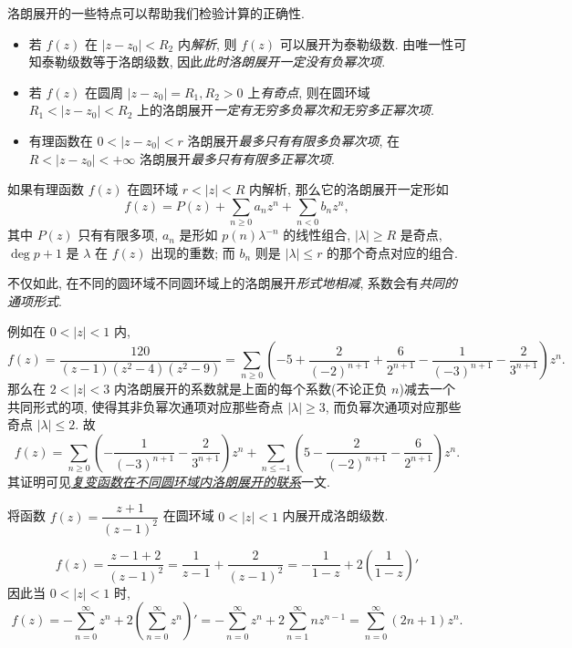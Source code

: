 洛朗展开的一些特点可以帮助我们检验计算的正确性.
\begin{itemize}
	\item  若 $f(z)$ 在 $|z-z_0|<R_2$ 内\emph{解析},
		则 $f(z)$ 可以展开为泰勒级数.
		由唯一性可知泰勒级数等于洛朗级数,
		因此\emph{此时洛朗展开一定没有负幂次项}.
	\item 若 $f(z)$ 在圆周 $|z-z_0|=R_1,R_2>0$ 上\emph{有奇点}, 则在圆环域 $R_1<|z-z_0|<R_2$ 上的洛朗展开\emph{一定有无穷多负幂次和无穷多正幂次项}.
	\item 有理函数在 $0<|z-z_0|<r$ 洛朗展开\emph{最多只有有限多负幂次项}, 在 $R<|z-z_0|<+\infty$ 洛朗展开\emph{最多只有有限多正幂次项}.
\end{itemize}

如果有理函数 $f(z)$ 在圆环域 $r<|z|<R$ 内解析, 那么它的洛朗展开一定形如
\[f(z)=P(z)+\sum_{n\ge 0}a_n z^n+\sum_{n<0}b_n z^n,\]
其中 $P(z)$ 只有有限多项, 
$a_n$ 是形如 $p(n)\lambda^{-n}$ 的线性组合, $|\lambda|\ge R$ 是奇点, $\deg p+1$ 是 $\lambda$ 在 $f(z)$ 出现的重数; 而 $b_n$ 则是 $|\lambda|\le r$ 的那个奇点对应的组合.

不仅如此, 在不同的圆环域不同圆环域上的洛朗展开{\itshape 形式地相减}, 系数会有\emph{共同的通项形式}.

例如在 $0<|z|<1$ 内,
\[f(z)=\frac{120}{(z-1)(z^2-4)(z^2-9)}=\sum_{n\ge 0}\left(-5+\frac2{(-2)^{n+1}}+\frac6{2^{n+1}}-\frac1{(-3)^{n+1}}-\frac2{3^{n+1}}\right)z^n.\]
那么在 $2<|z|<3$ 内洛朗展开的系数就是上面的每个系数(不论正负 $n$)减去一个共同形式的项, 使得其非负幂次通项对应那些奇点 $|\lambda|\ge 3$, 而负幂次通项对应那些奇点 $|\lambda|\le2$.
故
\[f(z)=\sum_{n\ge 0}\left(-\frac1{(-3)^{n+1}}-\frac2{3^{n+1}}\right)z^n+\sum_{n\le-1}\left(5-\frac2{(-2)^{n+1}}-\frac6{2^{n+1}}\right)z^n.\]
其证明可见\emph{\href{https://zhangshenxing.gitee.io/teaching/publications/袁志杰张神星2023 复变函数在不同圆环域内洛朗展开的联系.pdf}{复变函数在不同圆环域内洛朗展开的联系}}一文.

\begin{example}
	将函数 $f(z)=\dfrac{z+1}{(z-1)^2}$ 在圆环域 $0<|z|<1$ 内展开成洛朗级数.
\end{example}

\begin{solution}
	\[f(z)=\frac{z-1+2}{(z-1)^2}=\frac1{z-1}+\frac{2}{(z-1)^2}=-\frac1{1-z}+2\left(\frac1{1-z}\right)'\]
	{因此当 $0<|z|<1$ 时,
		\[f(z)=-\sum_{n=0}^\infty z^n+2\left(\sum_{n=0}^\infty z^n\right)'=-\sum_{n=0}^\infty z^n+2\sum_{n=1}^\infty nz^{n-1}
		=\sum_{n=0}^\infty(2n+1)z^n.\]}
\end{solution}

